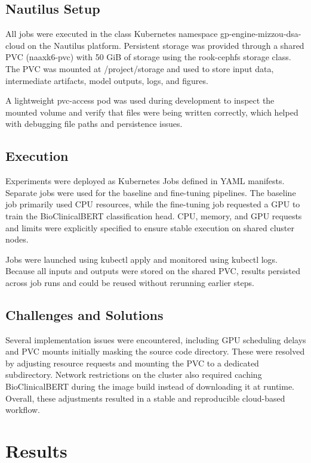 \documentclass[11pt]{article}
\begin{document}
\subsection{Nautilus Setup}

All jobs were executed in the class Kubernetes namespace gp-engine-mizzou-dsa-cloud on the Nautilus platform. Persistent storage was provided through a shared PVC (naaxk6-pvc) with 50 GiB of storage using the rook-cephfs storage class. The PVC was mounted at /project/storage and used to store input data, intermediate artifacts, model outputs, logs, and figures.

A lightweight pvc-access pod was used during development to inspect the mounted volume and verify that files were being written correctly, which helped with debugging file paths and persistence issues.

\subsection{Execution}

Experiments were deployed as Kubernetes Jobs defined in YAML manifests. Separate jobs were used for the baseline and fine-tuning pipelines. The baseline job primarily used CPU resources, while the fine-tuning job requested a GPU to train the BioClinicalBERT classification head. CPU, memory, and GPU requests and limits were explicitly specified to ensure stable execution on shared cluster nodes.

Jobs were launched using kubectl apply and monitored using kubectl logs. Because all inputs and outputs were stored on the shared PVC, results persisted across job runs and could be reused without rerunning earlier steps.

\subsection{Challenges and Solutions}

Several implementation issues were encountered, including GPU scheduling delays and PVC mounts initially masking the source code directory. These were resolved by adjusting resource requests and mounting the PVC to a dedicated subdirectory. Network restrictions on the cluster also required caching BioClinicalBERT during the image build instead of downloading it at runtime. Overall, these adjustments resulted in a stable and reproducible cloud-based workflow.

\section{Results}
\end{document}

